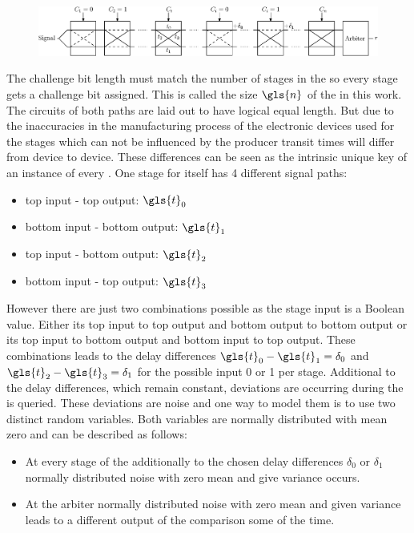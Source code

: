 \begin{figure}[ht]
\centering
\includegraphics[width=1.00\textwidth]{images/arbiter_puf.eps}
\caption{\apuf}
\label{fig:arbiter}
\end{figure}

The challenge bit length must match the number of stages in the \apuf so every stage gets a challenge bit assigned. 
This is called the size $\gls{n}$ of the \apuf in this work.
The circuits of both paths are laid out to have logical equal length.
But due to the inaccuracies in the manufacturing process of the electronic devices used for the stages which can not be influenced by the producer 
transit times will differ from device to device.
These differences can be seen as the intrinsic unique key of an instance of every \apuf.
One stage for itself has 4 different signal paths: 

\begin{itemize}
\item top input - top output: $\gls{t}_0$
\item bottom input - bottom output: $\gls{t}_1$
\item top input - bottom output: $\gls{t}_2$
\item bottom input - top output: $\gls{t}_3$
\end{itemize}

However there are just two combinations possible as the stage input is a Boolean value.
Either its top input to top output and bottom output to bottom output or its top input to bottom output and bottom input to top output.
These combinations leads to the delay differences $\gls{t}_0 - \gls{t}_1 = \delta_0$ and $\gls{t}_2 - \gls{t}_3 = \delta_1$ for the possible input 0 or 1 per stage.
Additional to the delay differences, which remain constant, deviations are occurring during the \apuf is queried.
These deviations are noise and one way to model them is to use two distinct random variables.
Both variables are normally distributed with mean zero and can be described as follows:

\begin{itemize}
\item At every stage of the \apuf additionally to the chosen delay differences $\delta_0$ or $\delta_1$ normally distributed noise with zero mean and give variance occurs.
\item At the arbiter normally distributed noise with zero mean and given variance leads to a different output of the comparison some of the time.
\end{itemize}

